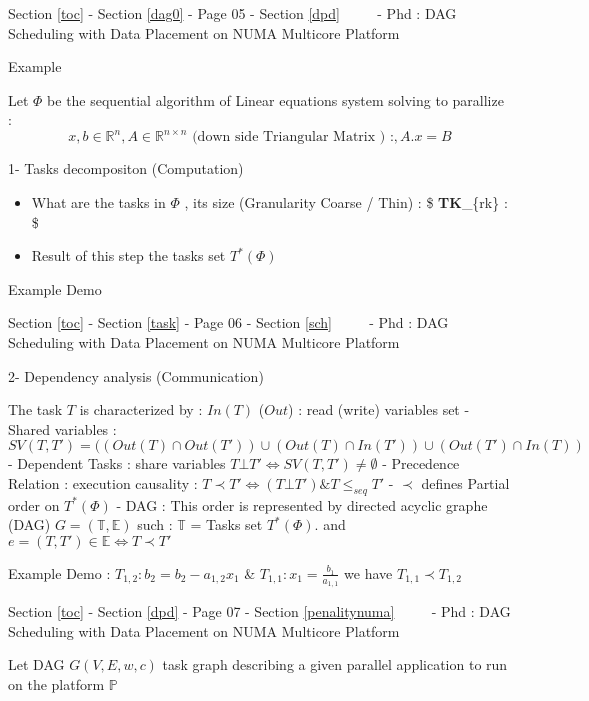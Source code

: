\documentclass[11pt]{article}
\providecommand{\tightlist}{%
      \setlength{\itemsep}{0pt}\setlength{\parskip}{0pt}}
\begin{document}
 

     {Section \ref{toc} - Section \ref{dag0} - Page 05 - Section \ref{dpd}
~~~~ - Phd : DAG Scheduling with Data Placement on NUMA Multicore
Platform}

Example

Let \(\Phi\) be the sequential algorithm of Linear equations system
solving to parallize : \[
x,b \in \mathbb{R}^n, A \in \mathbb{R}^{n \times n} \text{  (down side Triangular Matrix ) :} , A.x = B
\]

1- Tasks decompositon (Computation)

\begin{itemize}
\tightlist
\item
  What are the tasks in \(\Phi\) , its size (Granularity Coarse / Thin)
  : \$ \textbf{TK}\_\{rk\} :  \$
\item
  Result of this step the tasks set \(T^*(\Phi)\)
\end{itemize}

Example Demo

 

     {Section \ref{toc} - Section \ref{task} - Page 06 - Section \ref{sch}
~~~~ - Phd : DAG Scheduling with Data Placement on NUMA Multicore
Platform}

2- Dependency analysis (Communication)

The task \(T\) is characterized by : \(In(T)\) (\(Out\)) : read (write)
variables set - Shared variables :
\(SV(T,T') = ((Out(T) \cap Out(T')) \cup (Out(T) \cap In(T')) \cup (Out(T') \cap In(T))\)
- Dependent Tasks : share variables
\(T \bot T' \iff SV(T,T') \neq \emptyset\) - Precedence Relation :
execution causality : \(T \prec T' \iff (T \bot T') \& T \leq_{seq} T'\)
- \(\prec\) defines Partial order on \(T^*(\Phi)\) - DAG : This order is
represented by directed acyclic graphe (DAG)
\(G = (\mathbb{T},\mathbb{E})\) such : \(\mathbb{T}\) = Tasks set
\(T^*(\Phi)\). and \(e=(T,T') \in \mathbb{E} \iff T \prec T'\)

Example Demo : \(T_{1,2} : b_2 = b_2 - a_{1,2}x_1\) \&
\(T_{1,1} : x_1 = \frac{b_1}{a_{1,1}}\) we have
\(T_{1,1} \prec T_{1,2}\)

 

     {Section \ref{toc} - Section \ref{dpd} - Page 07 -
Section \ref{penalitynuma} ~~~~ - Phd : DAG Scheduling with Data
Placement on NUMA Multicore Platform}

Let DAG \(G(V,E,w,c)\) task graph describing a given parallel
application to run on the platform \(\mathbb{P}\)
\end{document}
